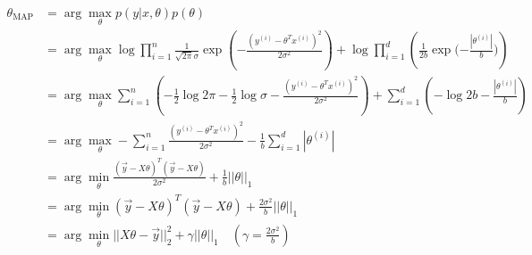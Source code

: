 \begin{answer}
    $$
    \begin{aligned}
        \theta_{\text{MAP}} 
        &=\arg\max_\theta p(y|x, \theta) p(\theta)\\
        &=\arg\max_\theta\log{\prod_{i=1}^n \frac{1}{\sqrt{2\pi}\sigma}\exp{\left(-\frac{(y^{(i)} - \theta^Tx^{(i)})^2}{2\sigma^2} \right)}} + \log{\prod_{i = 1}^d \left({\frac{1}{2b}}\exp (-{\frac{|\theta^{(i)}|}{b})}\right)}\\
        &=\arg\max_\theta\sum_{i=1}^n\left( -\frac{1}{2}\log{2\pi} - \frac{1}{2}\log{\sigma} -\frac{(y^{(i)} - \theta^Tx^{(i)})^2}{2\sigma^2}\right) + \sum_{i = 1}^d \left(-\log{2b} -\frac{|\theta^{(i)}|}{b}\right) \\
        &=\arg\max_\theta -\sum_{i=1}^n\frac{(y^{(i)} - \theta^Tx^{(i)})^2}{2\sigma^2} - \frac{1}{b} \sum_{i = 1}^d |\theta^{(i)}| \\
        &=\arg\min_\theta \frac{(\vec{y} - X\theta)^T(\vec{y} - X\theta)}{2\sigma^2} + \frac{1}{b} ||\theta||_1 \\
        &=\arg\min_\theta (\vec{y} - X\theta)^T(\vec{y} - X\theta) + \frac{2\sigma^2}{b} ||\theta||_1\\
        &=\arg\min_\theta ||X\theta - \vec{y}||^2_2 + \gamma||\theta||_1 \quad (\gamma = \frac{2\sigma^2}{b})  \\
    \end{aligned}
    $$
\end{answer}
